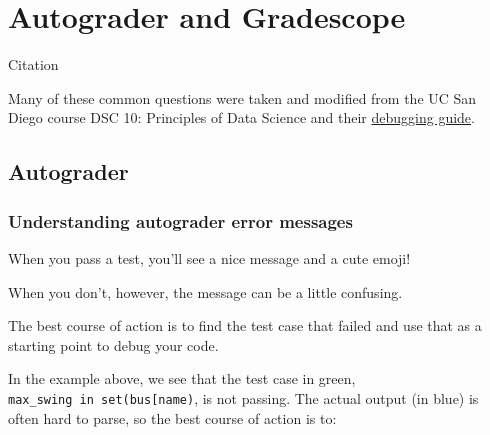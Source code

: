 \documentclass[
  letterpaper,
  DIV=11,
  numbers=noendperiod]{scrreprt}
\begin{document}

\chapter{Autograder and Gradescope}\label{autograder-and-gradescope}

Citation

Many of these common questions were taken and modified from the UC San
Diego course DSC 10: Principles of Data Science and their
\href{https://dsc10.com/debugging/}{debugging guide}.

\section{Autograder}\label{autograder}

\subsection{Understanding autograder error
messages}\label{understanding-autograder-error-messages}

When you pass a test, you'll see a nice message and a cute emoji!

When you don't, however, the message can be a little confusing.

The best course of action is to find the test case that failed and use
that as a starting point to debug your code.

In the example above, we see that the test case in green,
\texttt{max\_swing\ in\ set(bus{[}\textquotesingle{}name\textquotesingle{}{]})},
is not passing. The actual output (in blue) is often hard to parse, so
the best course of action is to:
\end{document}

